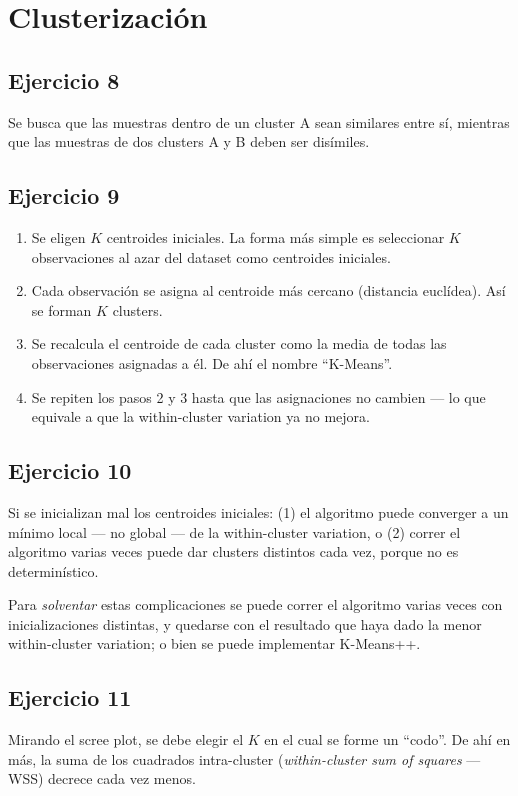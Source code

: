 \documentclass[a4paper,12pt]{article}
\begin{document}
\section*{Clusterización}
\subsection*{Ejercicio 8}
\noindent Se busca que las muestras dentro de un cluster A sean similares entre sí, mientras que las muestras de dos clusters A y B deben ser disímiles.
\subsection*{Ejercicio 9}
\begin{enumerate}
	\item Se eligen $K$ centroides iniciales. La forma más simple es seleccionar $K$ observaciones al azar del dataset como centroides iniciales.
	\item Cada observación se asigna al centroide más cercano (distancia euclídea). Así se forman $K$ clusters.
	\item Se recalcula el centroide de cada cluster como la media de todas las observaciones asignadas a él. De ahí el nombre ``K-Means''.
	\item Se repiten los pasos 2 y 3 hasta que las asignaciones no cambien --- lo que equivale a que la within-cluster variation ya no mejora.
\end{enumerate}
\subsection*{Ejercicio 10}
\noindent Si se inicializan mal los centroides iniciales: (1) el algoritmo puede converger a un mínimo local --- no global --- de la within-cluster variation, o (2) correr el algoritmo varias veces puede dar clusters distintos cada vez, porque no es determinístico.

\noindent Para \emph{solventar} estas complicaciones se puede correr el algoritmo varias veces con inicializaciones distintas, y quedarse con el resultado que haya dado la menor within-cluster variation; o bien se puede implementar K-Means++.
\subsection*{Ejercicio 11}
\noindent Mirando el scree plot, se debe elegir el $K$ en el cual se forme un ``codo''. De ahí en más, la suma de los cuadrados intra-cluster (\textit{within-cluster sum of squares} --- WSS) decrece cada vez menos.
\end{document}
